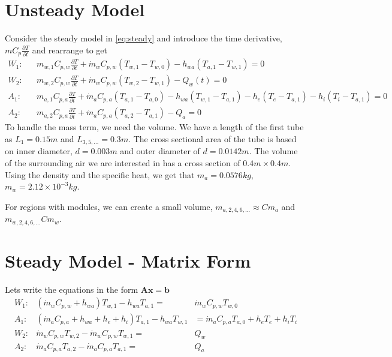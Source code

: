 \documentclass[11pt]{article}
\begin{document}
\section{Unsteady Model}
Consider the steady model in \ref{eq:steady} and introduce the time derivative, $mC_{p}\frac{\partial T}{\partial t}$ and rearrange to get 
\begin{eqnarray} 
W_1: & & m_{w,1}C_{p,w}\frac{\partial T}{\partial t} + \dot{m}_wC_{p,w}(T_{w,1}-T_{w,0}) - h_{wa}(T_{a,1}-T_{w,1}) = 0 \\
W_2: & & m_{w,2}C_{p,w}\frac{\partial T}{\partial t} + \dot{m}_wC_{p,w}(T_{w,2}-T_{w,1}) - Q_w(t) = 0\\
A_1: & & m_{a,1}C_{p,a}\frac{\partial T}{\partial t} + \dot{m}_aC_{p,a}(T_{a,1}-T_{a,0}) - h_{wa}(T_{w,1}-T_{a,1}) - h_{e}(T_e-T_{a,1}) - h_{i}(T_i-T_{a,1})= 0 \\
A_2: & & m_{a,2}C_{p,a}\frac{\partial T}{\partial t} +\dot{m}_aC_{p,a}(T_{a,2}-T_{a,1}) - Q_a = 0 
\end{eqnarray}
To handle the mass term, we need the volume. We have a length of the first tube as $L_1 = 0.15m$ and $L_{3,5,\ldots} = 0.3m$. The cross sectional area of the tube is based on inner diameter, $d = 0.003m$ and outer diameter of $d = 0.0142m$. The volume of the surrounding air we are interested in has a cross section of $0.4m \times 0.4m$. Using the density and the specific heat, we get that $m_a = 0.0576 kg$, $m_w = 2.12\times 10^{-3} kg$.

For regions with modules, we can create a small volume, $m_{a,2,4,6,\ldots} \approx Cm_a$ and $m_{w,2,4,6,\ldots} Cm_w$. 
\section{Steady Model - Matrix Form}
Lets write the equations in the form $\mathbf{A}\mathbf{x}=\mathbf{b}$
\begin{eqnarray} 
W_1: &  (\dot{m}_wC_{p,w}+h_{wa})T_{w,1} - h_{wa}T_{a,1} = &\dot{m}_wC_{p,w}T_{w,0}  \\
A_1: &  (\dot{m}_aC_{p,a}+h_{wa}+h_e+h_i)T_{a,1} -h_{wa}T_{w,1} &= \dot{m}_aC_{p,a}T_{a,0} +h_eT_e+h_iT_i \\
W_2: &  \dot{m}_wC_{p,w}T_{w,2}-\dot{m}_wC_{p,w}T_{w,1} = &Q_w\\
A_2: &  \dot{m}_aC_{p,a}T_{a,2}-\dot{m}_aC_{p,a}T_{a,1} = &Q_a
\label{eq:steady2}
\end{eqnarray}
\end{document}
